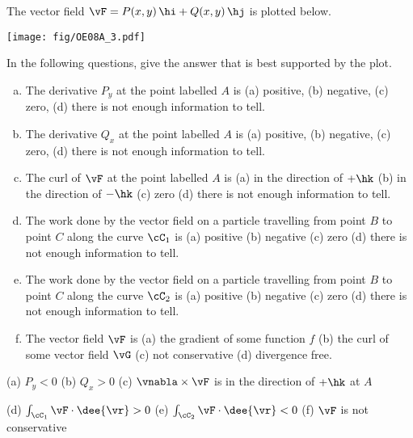 \begin{question}[M317 2008A] %
The vector field
$\vF = P (x, y)\,\hi + Q(x, y)\,\hj$
is plotted below. 

\begin{center}
       \texttt{[image: fig/OE08A\_3.pdf]}
\end{center}


In the following questions, give the answer that 
is best supported by the plot.
\begin{enumerate}[(a)]
\item
The derivative $P_y$ at the point labelled $A$ is 
   (a) positive, (b) negative, (c) zero, 
   (d) there is not enough information to tell.
\item
The derivative $Q_x$ at the point labelled $A$ is 
    (a) positive, (b) negative, (c) zero, 
    (d) there is not enough information to tell.
\item
The curl of $\vF$ at the point labelled $A$ is 
     (a) in the direction of $+\hk$ 
     (b) in the direction of $-\hk$ 
     (c) zero (d) there is not enough information to tell.
\item
The work done by the vector field on a particle travelling from point 
$B$ to point $C$ along the curve $\cC_1$ is 
    (a) positive (b) negative (c) zero 
    (d) there is not enough information to tell.
\item
The work done by the vector field on a particle travelling from point 
$B$ to point $C$ along the curve $\cC_2$ is 
    (a) positive (b) negative (c) zero 
    (d) there is not enough information to tell.
\item
The vector field $\vF$ is 
    (a) the gradient of some function $f$ 
    (b) the curl of some vector field $\vG$ 
    (c) not conservative 
    (d) divergence free.
\end{enumerate}
\end{question}

%


\begin{answer} 
(a) $P_y<0$ \qquad
(b) $Q_x>0$ \qquad
(c) $\vnabla\times\vF$ is in the direction of $+\hk$ at $A$

(d) $\int_{\cC_1}\vF\cdot\dee{\vr}>0$\qquad
(e) $\int_{\cC_2}\vF\cdot\dee{\vr}<0$\qquad
(f) $\vF$ is not conservative
\end{answer}

